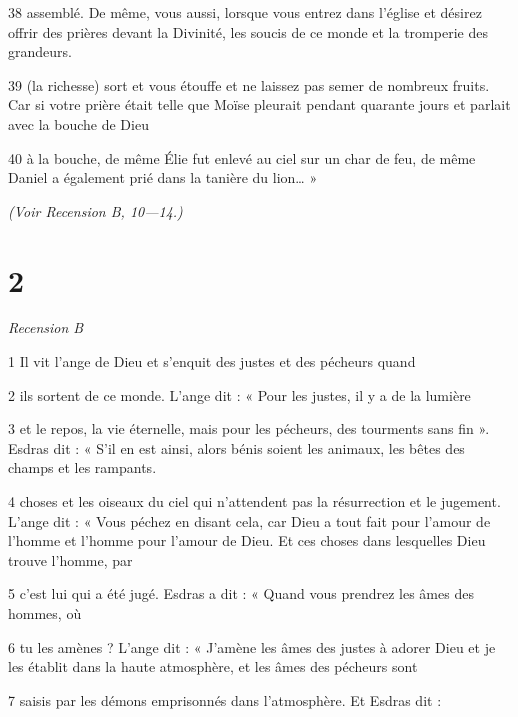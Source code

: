 \par 38 assemblé. De même, vous aussi, lorsque vous entrez dans l'église et désirez offrir des prières devant la Divinité, les soucis de ce monde et la tromperie des grandeurs.

\par 39 (la richesse) sort et vous étouffe et ne laissez pas semer de nombreux fruits. Car si votre prière était telle que Moïse pleurait pendant quarante jours et parlait avec la bouche de Dieu


\par 40 à la bouche, de même Élie fut enlevé au ciel sur un char de feu, de même Daniel a également prié dans la tanière du lion… »

\par \textit{(Voir Recension B, 10—14.)}

\chapter{2}

\par \textit{Recension B}

\par 1 Il vit l'ange de Dieu et s'enquit des justes et des pécheurs quand

\par 2 ils sortent de ce monde. L'ange dit : « Pour les justes, il y a de la lumière

\par 3 et le repos, la vie éternelle, mais pour les pécheurs, des tourments sans fin ». Esdras dit : « S'il en est ainsi, alors bénis soient les animaux, les bêtes des champs et les rampants.

\par 4 choses et les oiseaux du ciel qui n'attendent pas la résurrection et le jugement. L'ange dit : « Vous péchez en disant cela, car Dieu a tout fait pour l'amour de l'homme et l'homme pour l'amour de Dieu. Et ces choses dans lesquelles Dieu trouve l'homme, par

\par 5 c'est lui qui a été jugé. Esdras a dit : « Quand vous prendrez les âmes des hommes, où

\par 6 tu les amènes ? L'ange dit : « J'amène les âmes des justes à adorer Dieu et je les établit dans la haute atmosphère, et les âmes des pécheurs sont

\par 7 saisis par les démons emprisonnés dans l’atmosphère. Et Esdras dit :

